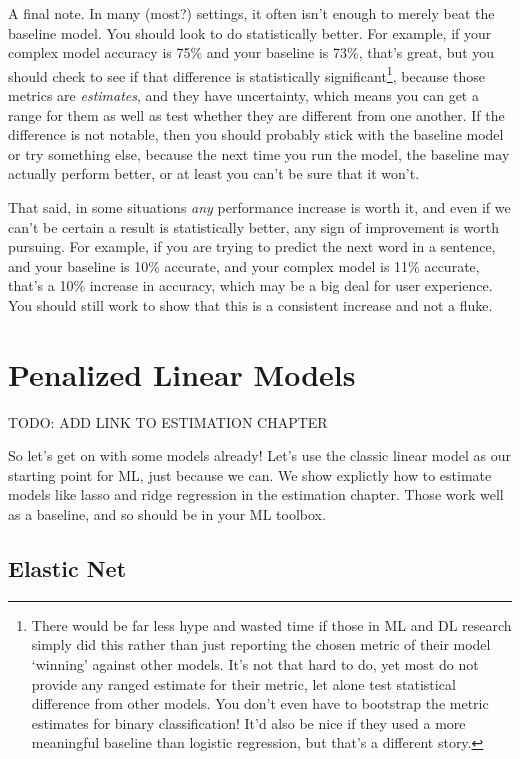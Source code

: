 \documentclass[
  letterpaper,
]{krantz}
\begin{document}
A final note. In many (most?) settings, it often isn't enough to merely
beat the baseline model. You should look to do statistically better. For
example, if your complex model accuracy is 75\% and your baseline is
73\%, that's great, but you should check to see if that difference is
statistically significant\footnote{There would be far less hype and
  wasted time if those in ML and DL research simply did this rather than
  just reporting the chosen metric of their model `winning' against
  other models. It's not that hard to do, yet most do not provide any
  ranged estimate for their metric, let alone test statistical
  difference from other models. You don't even have to bootstrap the
  metric estimates for binary classification! It'd also be nice if they
  used a more meaningful baseline than logistic regression, but that's a
  different story.}, because those metrics are \emph{estimates}, and
they have uncertainty, which means you can get a range for them as well
as test whether they are different from one another. If the difference
is not notable, then you should probably stick with the baseline model
or try something else, because the next time you run the model, the
baseline may actually perform better, or at least you can't be sure that
it won't.

That said, in some situations \emph{any} performance increase is worth
it, and even if we can't be certain a result is statistically better,
any sign of improvement is worth pursuing. For example, if you are
trying to predict the next word in a sentence, and your baseline is 10\%
accurate, and your complex model is 11\% accurate, that's a 10\%
increase in accuracy, which may be a big deal for user experience. You
should still work to show that this is a consistent increase and not a
fluke.

\section{Penalized Linear Models}\label{penalized-linear-models}

TODO: ADD LINK TO ESTIMATION CHAPTER

So let's get on with some models already! Let's use the classic linear
model as our starting point for ML, just because we can. We show
explictly how to estimate models like lasso and ridge regression in the
estimation chapter. Those work well as a baseline, and so should be in
your ML toolbox.

\subsection{Elastic Net}\label{elastic-net}
\end{document}
